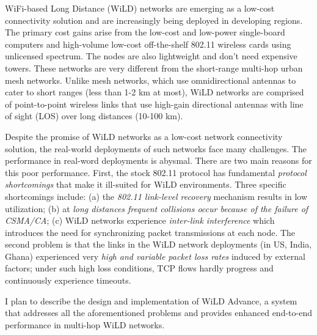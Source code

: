 \documentclass[twocolumn,11pt,twoside]{article}
\begin{document}
WiFi-based Long Distance (WiLD) networks are emerging as a low-cost connectivity solution and are increasingly being deployed in developing regions. The primary cost gains arise from the low-cost and low-power single-board computers and high-volume low-cost off-the-shelf 802.11 wireless cards using unlicensed spectrum. The nodes are also lightweight and don't need expensive towers. These networks are very different from the short-range multi-hop urban mesh networks. Unlike mesh networks, which use omnidirectional antennas to cater to short ranges (less than 1-2 km at most), WiLD networks are comprised of point-to-point wireless links that use high-gain directional antennas with line of sight (LOS) over long distances (10-100 km).

Despite the promise of WiLD networks as a low-cost network connectivity solution, the real-world deployments of such networks face many challenges. The performance in real-word deployments is abysmal. There are two main reasons for this poor performance. First, the stock 802.11 protocol has fundamental \textit{protocol shortcomings} that make it ill-suited for WiLD environments. Three specific shortcomings include: (a) the \textit{802.11 link-level recovery} mechanism results in low utilization; (b) at \textit{long distances frequent collisions occur because of the failure of CSMA/CA}; (c) WiLD networks experience \textit{inter-link interference} which introduces the need for synchronizing packet transmissions at each node. The second problem is that the links in the WiLD network deployments (in US, India, Ghana) experienced very \textit{high and variable packet loss rates} induced by external factors; under such high loss conditions, TCP flows hardly progress and continuously experience timeouts.

I plan to describe the design and implementation of WiLD Advance, a system that addresses all the aforementioned problems and provides enhanced end-to-end performance in multi-hop WiLD networks.


\end{document}
